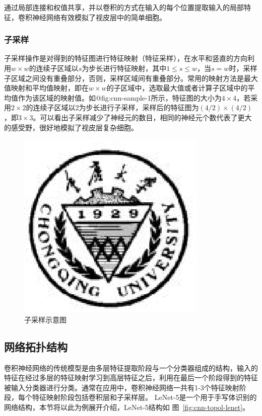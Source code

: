 \documentclass[bachelor,zhspacing]{cqu}  %
\begin{document}
通过局部连接和权值共享，并以卷积的方式在输入的每个位置提取输入的局部特征，卷积神经网络有效模拟了视皮层中的简单细胞。

\subsubsection{子采样}\label{ux5b50ux91c7ux6837}

子采样操作是对得到的特征图进行特征映射（特征采样），在水平和竖直的方向利用\(w\times w\)的连续子区域以\(s\)为步长进行特征映射，其中\(1\le s\le w\)，当\(s = w\)时，采样子区域之间没有重叠部分，否则，采样区域间有重叠部分。常用的映射方法是最大值映射和平均值映射，即在\(w\times w\)的子区域中，选取最大值或者计算子区域中的平均值作为该区域的映射值。如@fig:cnn-sample-1所示，特征图的大小为\(4\times 4\)，若采用\(2\times 2\)的连续子区域以2为步长进行子采样，采样后的特征图为\((4/2)\times (4/2)\)，即\(3 \times 3\)。可以看出子采样减少了神经元的数目，相同的神经元个数代表了更大的感受野，很好地模拟了视皮层复杂细胞。

\begin{figure}[htbp]
\centering
\includegraphics{./pic/cqu.eps}
\caption{子采样示意图}\label{fig:cnn-sample-1}
\end{figure}

\subsection{网络拓扑结构}\label{ux7f51ux7edcux62d3ux6251ux7ed3ux6784}

卷积神经网络的传统模型是由多层特征提取阶段与一个分类器组成的结构，输入的特征在经过多层的特征映射学习到高层特征之后，利用在最后一个阶段得到的特征被输入分类器进行分类。通常在应用中，卷积神经网络一共有1-3个特征映射阶段，每个特征映射阶段包括卷积层和子采样层。
LeNet-5是一个用于手写体识别的网络结构，本节将以此为例展开介绍，LeNet-5结构如
图~\ref{fig:cnn-topol-lenet}。
\end{document}

